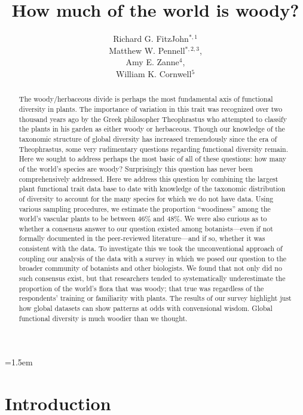 \documentclass[12pt]{article}
\title{How much of the world is woody?}
\author{
Richard G. FitzJohn$^{*,1}$\\ Matthew W. Pennell$^{*,2,3}$,\\ Amy E. Zanne$^{4}$,\\ William K. Cornwell$^{5}$
}
\date{}
\affiliation{\noindent
$^*$ These authors contributed equally}
\begin{document}
\mstitlepage
\parindent=1.5em
\addtolength{\parskip}{.3em}

\begin{abstract}
The woody/herbaceous divide is perhaps the most fundamental axis of functional diversity in plants. The importance of variation in this trait was recognized over two thousand years ago by the Greek philosopher Theophrastus who attempted to classify the plants in his garden as either woody or herbaceous. Though our knowledge of the taxonomic structure of global diversity has increased tremendously since the era of Theophrastus, some very rudimentary questions regarding functional diversity remain. Here we sought to address perhaps the most basic of all of these questions: how many of the world's species are woody? Surprisingly this question has never been comprehensively addressed. Here we address this question by combining the largest plant functional trait data base to date with knowledge of the taxonomic distribution of diversity to account for the many species for which we do not have data. Using various sampling procedures, we estimate the proportion ``woodiness'' among the world's vascular plants to be between 46\% and 48\%. We were also curious as to whether a consensus answer to our question existed among botanists---even if not formally documented in the peer-reviewed literature---and if so, whether it was consistent with the data. To investigate this we took the unconventional approach of coupling our analysis of the data with a survey in which we posed our question to the broader community of botanists and other biologists.  We found that not only did no such consensus exist, but that researchers tended to systematically underestimate the proportion of the world's flora that was woody; that true was regardless of the respondents' training or familiarity with plants. The results of our survey highlight just how global datasets can show patterns at odds with convensional wisdom.  Global functional diversity is much woodier than we thought.  
\end{abstract}

\section{Introduction}
\end{document}
